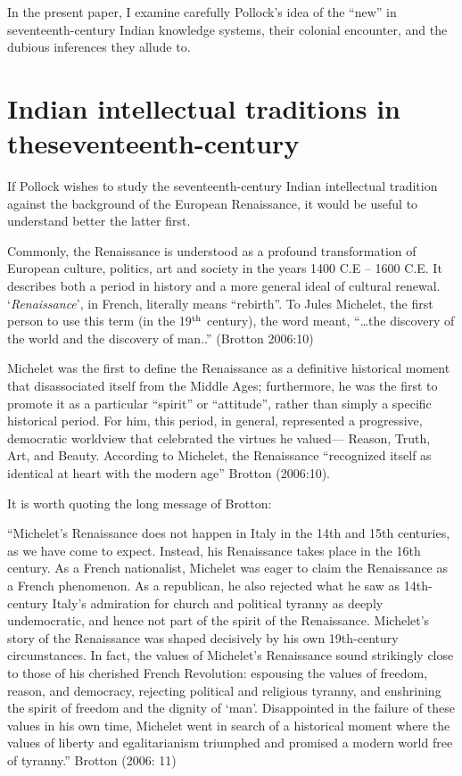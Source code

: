 In the present paper, I examine carefully Pollock’s idea of the “new” in seventeenth-century Indian knowledge systems, their colonial encounter, and the dubious inferences they allude to.

\section{Indian intellectual traditions in the\newline seventeenth-century}

If Pollock wishes to study the seventeenth-century Indian intellectual tradition against the background of the European Renaissance, it would be useful to understand better the latter first. 

Commonly, the Renaissance is understood as a profound transformation of European culture, politics, art and society in the years 1400 C.E – 1600 C.E.  It describes both a period in history and a more general ideal of cultural renewal. ‘{\em Renaissance}’, in French, literally means “rebirth”. To Jules Michelet, the first person to use this term (in the 19$^{\rm th}$ century), the word meant, “…the discovery of the world and the discovery of man..” (Brotton 2006:10) 

Michelet was the first to define the Renaissance as a definitive historical moment that disassociated itself from the Middle Ages; furthermore, he was the first to promote it as a particular “spirit” or “attitude”, rather than simply a specific historical period. For him, this period, in general, represented a progressive, democratic worldview that celebrated the virtues he valued— Reason, Truth, Art, and Beauty. According to Michelet, the Renaissance “recognized itself as identical at heart with the modern age” Brotton (2006:10).

It is worth quoting the long message of Brotton: 
\begin{myquote} 
“Michelet’s Renaissance does not happen in Italy in the 14th and 15th centuries, as we have come to expect. Instead, his Renaissance takes place in the 16th century. As a French nationalist, Michelet was eager to claim the Renaissance as a French phenomenon. As a republican, he also rejected what he saw as 14th-century Italy’s admiration for church and political tyranny as deeply undemocratic, and hence not part of the spirit of the Renaissance. Michelet’s story of the Renaissance was shaped decisively by his own 19th-century circumstances. In fact, the values of Michelet’s Renaissance sound strikingly close to those of his cherished French Revolution: espousing the values of freedom, reason, and democracy, rejecting political and religious tyranny, and enshrining the spirit of freedom and the dignity of ‘man’. Disappointed in the failure of these values in his own time, Michelet went in search of a historical moment where the values of liberty and egalitarianism triumphed and promised a modern world free of tyranny.”	\hfill{Brotton (2006: 11)}
\end{myquote}


